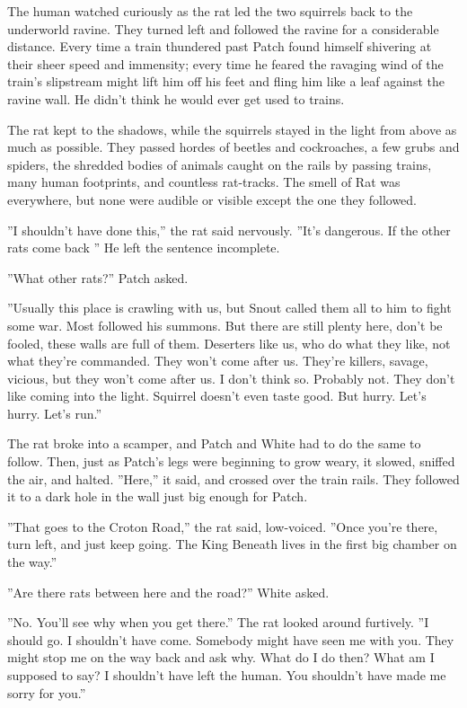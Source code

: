 \documentclass[12pt]{book}
\begin{document}
 The human watched curiously as the rat led the two squirrels back to the underworld ravine. They turned left and followed the ravine for a considerable distance. Every time a train thundered past Patch found himself shivering at their sheer speed and immensity; every time he feared the ravaging wind of the train's slipstream might lift him off his feet and fling him like a leaf against the ravine wall. He didn't think he would ever get used to trains.\par
 The rat kept to the shadows, while the squirrels stayed in the light from above as much as possible. They passed hordes of beetles and cockroaches, a few grubs and spiders, the shredded bodies of animals caught on the rails by passing trains, many human footprints, and countless rat-tracks. The smell of Rat was everywhere, but none were audible or visible except the one they followed.\par
 ''I shouldn't have done this,'' the rat said nervously. ''It's dangerous. If the other rats come back %
'' He left the sentence incomplete.\par
 ''What other rats?'' Patch asked.\par
 ''Usually this place is crawling with us, but Snout called them all to him to fight some war. Most followed his summons. But there are still plenty here, don't be fooled, these walls are full of them. Deserters like us, who do what they like, not what they're commanded. They won't come after us. They're killers, savage, vicious, but they won't come after us. I don't think so. Probably not. They don't like coming into the light. Squirrel doesn't even taste good. But hurry. Let's hurry. Let's run.''\par
 The rat broke into a scamper, and Patch and White had to do the same to follow. Then, just as Patch's legs were beginning to grow weary, it slowed, sniffed the air, and halted. ''Here,'' it said, and crossed over the train rails. They followed it to a dark hole in the wall just big enough for Patch.\par
 ''That goes to the Croton Road,'' the rat said, low-voiced. ''Once you're there, turn left, and just keep going. The King Beneath lives in the first big chamber on the way.''\par
 ''Are there rats between here and the road?'' White asked.\par
 ''No. You'll see why when you get there.'' The rat looked around furtively. ''I should go. I shouldn't have come. Somebody might have seen me with you. They might stop me on the way back and ask why. What do I do then? What am I supposed to say? I shouldn't have left the human. You shouldn't have made me sorry for you.''\par
\end{document}
